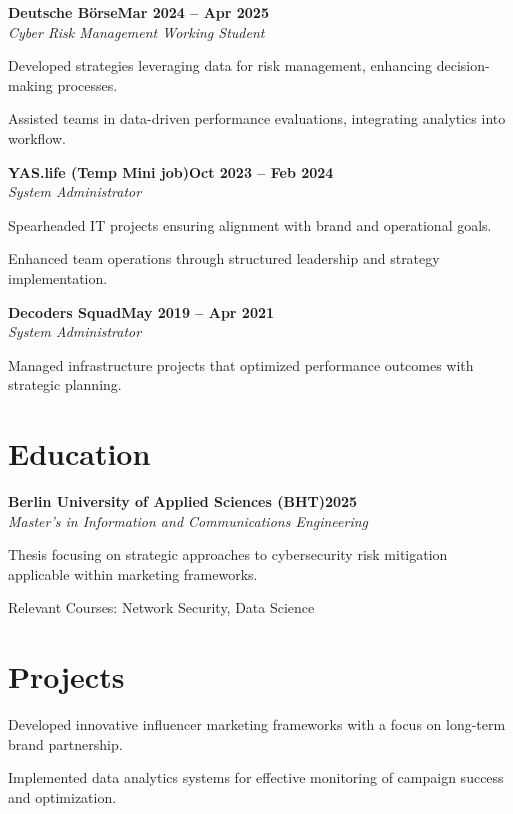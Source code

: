 \documentclass[letterpaper,10pt]{article}
\newcommand{\heading}[2]{
  \hspace{10pt}#1\hfill#2\\
}
\newcommand{\headingBf}[2]{
  \heading{\textbf{#1}}{\textbf{#2}}
}
\newcommand{\headingIt}[2]{
  \heading{\textit{#1}}{\textit{#2}}
}
\newenvironment{resume_list}{
  \vspace{-7pt}
  \begin{itemize}[itemsep=-2px, parsep=1pt, leftmargin=20pt, labelsep=10pt]
}{
  \end{itemize}
}
\begin{document}
\headingBf{Deutsche Börse}{Mar 2024 -- Apr 2025}
\headingIt{Cyber Risk Management Working Student}{}
\begin{resume_list}
  \item Developed strategies leveraging data for risk management, enhancing decision-making processes.
  \item Assisted teams in data-driven performance evaluations, integrating analytics into workflow.
\end{resume_list}

\vspace{-0.5em}
\headingBf{YAS.life (Temp Mini job)}{Oct 2023 -- Feb 2024}
\headingIt{System Administrator}{}
\begin{resume_list}
  \item Spearheaded IT projects ensuring alignment with brand and operational goals.
  \item Enhanced team operations through structured leadership and strategy implementation.
\end{resume_list}

\vspace{-0.5em}
\headingBf{Decoders Squad}{May 2019 -- Apr 2021}
\headingIt{System Administrator}{}
\begin{resume_list}
  \item Managed infrastructure projects that optimized performance outcomes with strategic planning.
\end{resume_list}

\section{Education}

\headingBf{Berlin University of Applied Sciences (BHT)}{2025}
\headingIt{Master's in Information and Communications Engineering}{}
\begin{resume_list}
  \item Thesis focusing on strategic approaches to cybersecurity risk mitigation applicable within marketing frameworks.
  \item Relevant Courses: Network Security, Data Science
\end{resume_list}

\section{Projects}

\begin{resume_list}
    \item Developed innovative influencer marketing frameworks with a focus on long-term brand partnership.
    \item Implemented data analytics systems for effective monitoring of campaign success and optimization.
\end{resume_list}
\end{document}
